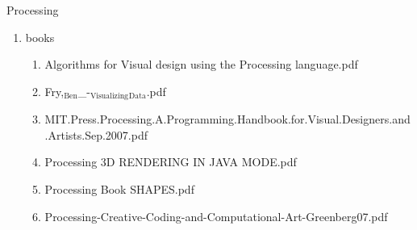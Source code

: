 \documentclass[11pt]{article}
\begin{document}
\item Processing
\label{sec-1-1-1-1-38-8}
\begin{enumerate}
\item books
\label{sec-1-1-1-1-38-8-1}
\begin{enumerate}
\item Algorithms for Visual design using the Processing language.pdf
\label{sec-1-1-1-1-38-8-1-1}

\item Fry,$_{\text{Ben}}$\_-$_{\text{Visualizing}}$$_{\text{Data}}$.pdf
\label{sec-1-1-1-1-38-8-1-2}

\item MIT.Press.Processing.A.Programming.Handbook.for.Visual.Designers.and.Artists.Sep.2007.pdf
\label{sec-1-1-1-1-38-8-1-3}

\item Processing 3D RENDERING IN JAVA MODE.pdf
\label{sec-1-1-1-1-38-8-1-4}

\item Processing Book SHAPES.pdf
\label{sec-1-1-1-1-38-8-1-5}

\item Processing-Creative-Coding-and-Computational-Art-Greenberg07.pdf
\label{sec-1-1-1-1-38-8-1-6}
\end{enumerate}
\end{enumerate}
\end{document}
